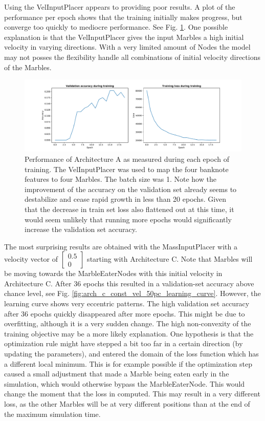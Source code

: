 Using the VelInputPlacer appears to providing poor results. A plot of the performance per epoch shows that the training initially makes progress, but converge too quickly to mediocre performance. See Fig. \ref{fig:velinputplacer_performance}. One possible explanation is that the VelInputPlacer gives the input Marbles a high initial velocity in varying directions. With a very limited amount of Nodes the model may not posses the flexibility handle all combinations of initial velocity directions of the Marbles. 

\begin{figure}[hb]
	\centering
	\includegraphics[scale=0.4]{figures/A_batch1_velinputplacer.pdf}
	\caption{Performance of Architecture A as measured during each epoch of training. The VelInputPlacer was used to map the four banknote features to four Marbles. The batch size was 1. Note how the improvement of the accuracy on the validation set already seems to destabilize and cease rapid growth in less than 20 epochs. Given that the decrease in train set loss also flattened out at this time, it would seem unlikely that running more epochs would significantly increase the validation set accuracy.}
	\label{fig:velinputplacer_performance}
\end{figure}

\clearpage

The most surprising results are obtained with the MassInputPlacer with a velocity vector of $\begin{bmatrix} 0.5\\0\end{bmatrix}$ starting with Architecture C. Note that Marbles will be moving towards the MarbleEaterNodes with this initial velocity in Architecture C. After 36 epochs this resulted in a validation-set accuracy above chance level, see Fig. \ref{fig:arch_c_const_vel_50pc_learning_curve}. However, the learning curve shows very eccentric patterns. The high validation set accuracy after 36 epochs quickly disappeared after more epochs. This might be due to overfitting, although it is a very sudden change. The high non-convexity of the training objective may be a more likely explanation. One hypothesis is that the optimization rule might have stepped a bit too far in a certain direction (by updating the parameters), and entered the domain of the loss function which has a different local minimum. This is for example possible if the optimization step caused a small adjustment that made a Marble being eaten early in the simulation, which would otherwise bypass the MarbleEaterNode. This would change the moment that the loss in computed. This may result in a very different loss, as the other Marbles will be at very different positions than at the end of the maximum simulation time.

